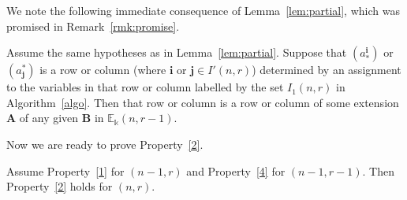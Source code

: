 \documentclass[ALCO,ThmDefs,Unicode,epreuves]{cedram}
\newcommand{\E}{\mathbb{E}}
\newcommand{\bi}{{\boldsymbol{i}}} %
\newcommand{\bj}{{\boldsymbol{j}}}
\newcommand{\bA}{\mathbf{A}}
\newcommand{\bB}{\mathbf{B}}
\begin{document}
We note the following immediate consequence of Lemma~\ref{lem:partial}, which was promised in Remark~\ref{rmk:promise}.

\begin{coro}\label{cor:colouring}
Assume the same hypotheses as in Lemma~\ref{lem:partial}. Suppose that
$(a^\bi_*)$ or $(a^*_\bj)$ is a row or column \textup{(}where $\bi$ or
$\bj \in I'(n,r)$\textup{)} determined by an assignment to the
variables in that row or column labelled by the set $I_1(n,r)$ in
Algorithm~\ref{algo}. Then that row or column is a row or column of
some extension $\bA$ of any given $\bB$ in $\E_\Bbbk(n,r-1)$.
\end{coro}

Now we are ready to prove Property~\ref{2}. 

\begin{prop}\label{prop:decomp}
Assume Property~\ref{1} for $(n-1,r)$ and Property~\ref{4} for
$(n-1,r-1)$. Then Property~\ref{2} holds for $(n,r)$.
\end{prop}
\end{document}
